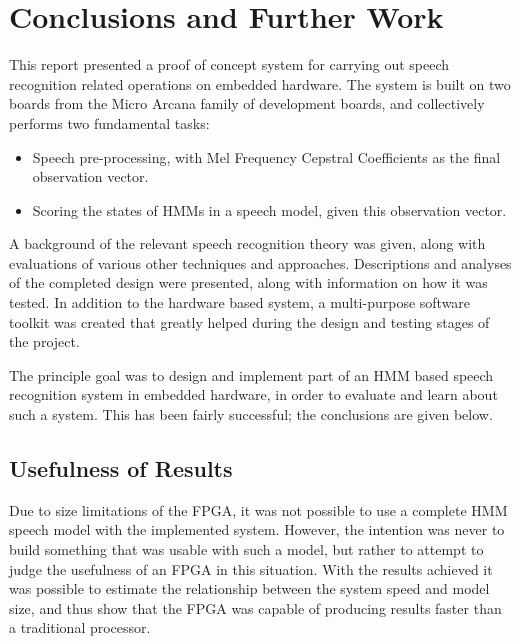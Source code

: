 \chapter{Conclusions and Further Work} %
\label{cha:conclusions_and_future_work}


This report presented a proof of concept system for carrying out speech recognition related operations on embedded hardware.  The system is built on two boards from the Micro Arcana family of development boards, and collectively performs two fundamental tasks:
\begin{itemize}
	\item Speech pre-processing, with Mel Frequency Cepstral Coefficients as the final observation vector.
	\item Scoring the states of HMMs in a speech model, given this observation vector.
\end{itemize}

A background of the relevant speech recognition theory was given, along with evaluations of various other techniques and approaches.  Descriptions and analyses of the completed design were presented, along with information on how it was tested.  In addition to the hardware based system, a multi-purpose software toolkit was created that greatly helped during the design and testing stages of the project.

The principle goal was to design and implement part of an HMM based speech recognition system in embedded hardware, in order to evaluate and learn about such a system.  This has been fairly successful; the conclusions are given below.


\section{Usefulness of Results} %
\label{sec:usefulness}
	Due to size limitations of the FPGA, it was not possible to use a complete HMM speech model with the implemented system.  However, the intention was never to build something that was usable with such a model, but rather to attempt to judge the usefulness of an FPGA in this situation.  With the results achieved it was possible to estimate the relationship between the system speed and model size, and thus show that the FPGA was capable of producing results faster than a traditional processor.

